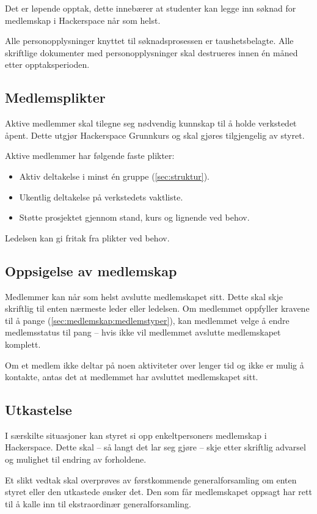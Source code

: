Det er løpende opptak, dette innebærer at studenter kan legge inn
søknad for medlemskap i Hackerspace når som helst.

Alle personopplysninger knyttet til søknadsprosessen er taushetsbelagte. Alle skriftlige dokumenter med personopplysninger skal destrueres innen én måned etter opptaksperioden.

\subsection{Medlemsplikter}\label{sec:medlemskap:medlemsplikter}
Aktive medlemmer skal tilegne seg nødvendig kunnskap til å holde verkstedet åpent.
Dette utgjør Hackerspace Grunnkurs og skal gjøres tilgjengelig av styret.

Aktive medlemmer har følgende faste plikter:
\begin{itemize}
\item Aktiv deltakelse i minst én gruppe (\ref{sec:struktur}).
\item Ukentlig deltakelse på verkstedets vaktliste.
\item Støtte prosjektet gjennom stand, kurs og lignende ved behov.
\end{itemize}
Ledelsen kan gi fritak fra plikter ved behov.

\subsection{Oppsigelse av medlemskap}\label{sec:medlemskap:oppsigelse}
Medlemmer kan når som helst avslutte medlemskapet sitt.
Dette skal skje skriftlig til enten nærmeste leder eller ledelsen.
Om medlemmet oppfyller kravene til å pange (\ref{sec:medlemskap:medlemstyper}), kan medlemmet velge å endre medlemsstatus til pang -- hvis ikke vil medlemmet avslutte medlemskapet komplett.

Om et medlem ikke deltar på noen aktiviteter over lenger tid og ikke er mulig å kontakte, antas det at medlemmet har avsluttet medlemskapet sitt.

\subsection{Utkastelse}\label{sec:medlemskap:utkastelse}
I særskilte situasjoner kan styret si opp enkeltpersoners medlemskap i Hackerspace.
Dette skal -- så langt det lar seg gjøre -- skje etter skriftlig advarsel og mulighet til endring av forholdene.

Et slikt vedtak skal overprøves av førstkommende generalforsamling om enten styret eller den utkastede ønsker det. Den som får medlemskapet oppsagt har rett til å kalle inn til ekstraordinær generalforsamling.


